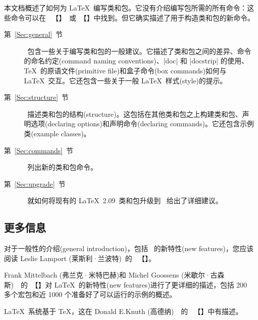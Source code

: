 \documentclass{ltxguide}[1995/11/28]
\begin{document}
本文档概述了如何为 \LaTeX{}\ 编写类和包。它{\kaiti 没有}介绍编写包所需的所有命令：这些命令可以在\ {\color{blue} {\emph{\LaTeXbook}}}【{\color{blue}{《\LaTeX：一个文档准备系统》}}】\ 或\ {\color{blue}{\emph{\LaTeXcomp}}}【{}】中找到。但它确实描述了用于构造类和包的新命令。

\begin{description}

   \item[第~\ref{Sec:general}~节] \ 包含一些关于编写类和包的一般建议。它描述了类和包之间的差异、命令的命名约定(command naming conventions)、|doc| 和 |docstrip| 的使用、\TeX\ 的原语文件(primitive file)和盒子命令(box commands)如何与 \LaTeX{}\ 交互。它还包含一些关于一般 \LaTeX{}\ 样式(style)的提示。

   \item[第~\ref{Sec:structure}~节] \ 描述类和包的结构(structure)。这包括在其他类和包之上构建类和包、声明选项(declaring options)和声明命令(declaring commands)。它还包含示例类(example classes)。

   \item[第~\ref{Sec:commands}~节] \ 列出新的类和包命令。

   \item[第~\ref{Sec:upgrade}~节] \ 就如何将现有的 \LaTeX~2.09\ 类和包升级到 \LaTeXe{}\ 给出了详细建议。

\end{description}

\subsection[更多信息]{\heiti 更多信息}

对于一般性的介绍(general introduction)，包括 \LaTeXe\ 的新特性(new features)，您应该阅读 Leslie Lamport (莱斯利·兰波特)~\cite{A-W:LLa94}的\ {\color{blue} {\emph{\LaTeXbook}}}\qquad【{\color{blue}{《\LaTeX：一个文档准备系统》}}】。

Frank Mittelbach (弗兰克·米特巴赫)和 Michel Goossens (米歇尔·古森斯)~\cite{A-W:MG2004}~的\ {}【{}】对 \LaTeX\ 的新特性(new features)进行了更详细的描述，包括 200 多个宏包和近 1000 个准备好了可以运行的示例的概述。

\LaTeX{}\ 系统基于 \TeX{}，这在 Donald E.Knuth (高德纳)~\cite{A-W:DEK91}~的\ {} 【{\color{blue}{《特可爱原本》}}】中有描述。
\end{document}

